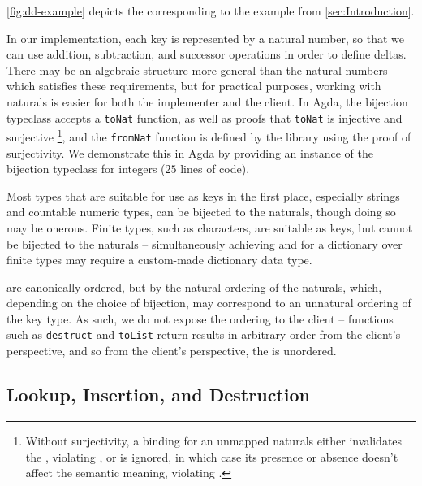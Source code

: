 \autoref{fig:dd-example} depicts the \dd{} corresponding to the example from \autoref{sec:Introduction}.


In our implementation, each key is represented by a natural number, so that we can use addition, subtraction, and successor operations in order to define deltas.
%
There may be an algebraic structure more general than the natural numbers which satisfies these requirements, but for practical purposes, working with naturals
%
is easier for both the implementer and the client. In Agda, the bijection typeclass accepts a \texttt{toNat} function, as well as proofs that \texttt{toNat}
%
is injective and surjective
%
\footnote{\hspace{0.01in}%
Without surjectivity, a binding for an unmapped naturals either invalidates the \dd, violating \Total, or is ignored, in which case its presence or absence doesn't affect the semantic meaning, violating \Extensional.
},
%
and the \texttt{fromNat} function is defined by the library using the proof of surjectivity.
%
We demonstrate this in Agda by
%
providing an instance of the bijection typeclass for integers ($25$ lines of code).

Most types that are suitable for use as keys in the first place, especially strings and countable numeric types, can be bijected to the naturals,
%
though doing so may be onerous. Finite types, such as characters, are suitable as keys, but cannot be bijected to the naturals --
%
simultaneously achieving \Total{} and \Extensional{} for a dictionary over finite types may require a custom-made dictionary data type.

\Ddls{} are canonically ordered, but by the natural ordering of the naturals, which, depending on the choice of bijection, may correspond to an unnatural
%
ordering of the key type. As such, we do not expose the ordering to the client -- functions such as \texttt{destruct} and \texttt{toList} return results
%
in arbitrary order from the client's perspective, and so from the client's perspective, the \dd{} is unordered.

\subsection{Lookup, Insertion, and Destruction}
\label{sec:DD:basics}


